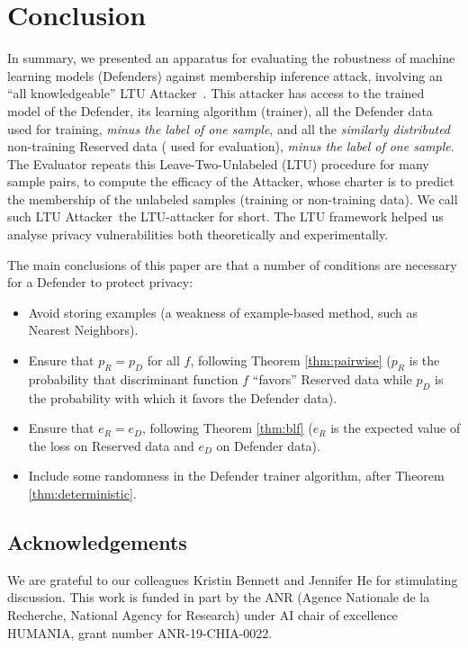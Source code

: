 \documentclass[letterpaper]{article}
\newcommand{\oracle}{LTU Attacker~}
\begin{document}

\section{Conclusion}
In summary, we presented an apparatus for evaluating the robustness of machine learning models (Defenders) against membership inference attack, involving an ``all knowledgeable'' \oracle. This attacker 
has access to the trained model of the Defender, its learning algorithm (trainer), all the Defender data used %
for training, {\em minus the label of one sample}, and all the {\em similarly distributed} non-training Reserved data (%
used for evaluation), {\em minus the label of one sample}. The Evaluator repeats this Leave-Two-Unlabeled (LTU) procedure for many sample pairs, to compute the efficacy of the Attacker, whose charter is to predict the membership of the unlabeled samples (training or non-training data). We call such \oracle the LTU-attacker for short. The LTU framework helped us analyse privacy vulnerabilities both theoretically and experimentally.

The main conclusions of this paper are that a number of conditions are necessary for a Defender to protect privacy:
\begin{itemize}
    \item Avoid storing examples (a weakness of example-based method, such as Nearest Neighbors).
    \item Ensure that $p_R=p_D$ for all $f$, following Theorem \ref{thm:pairwise} ($p_R$ is the probability that discriminant function $f$ ``favors'' Reserved data while $p_D$ is the probability with which it favors the Defender data). 
    \item Ensure that $e_R=e_D$, following Theorem \ref{thm:blf} ($e_R$ is the expected value of the loss on Reserved data and $e_D$ on Defender data).
    \item Include some randomness in the Defender trainer algorithm, after Theorem \ref{thm:deterministic}.
\end{itemize}


\subsection*{Acknowledgements}
We are grateful to our colleagues Kristin Bennett and Jennifer He for stimulating discussion. This work is funded in part by the ANR (Agence Nationale de la Recherche, National Agency for Research) under AI chair of excellence HUMANIA, grant number ANR-19-CHIA-0022.
\end{document}

